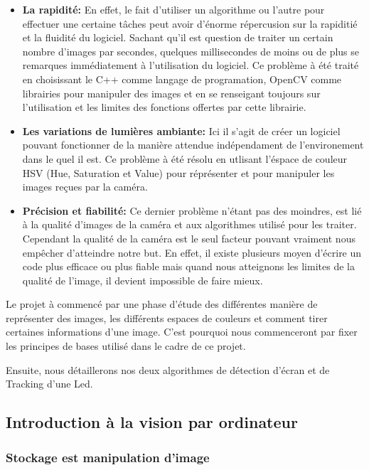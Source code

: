 \documentclass[11pt,a4paper,oldfontcommands]{memoir}
\begin{document}
\begin{itemize}
\item \textbf{La rapidité:} En effet, le fait d'utiliser un algorithme ou l'autre pour effectuer une certaine tâches peut avoir d'énorme répercusion sur la rapiditié et la fluidité du logiciel. Sachant qu'il est question de traiter un certain nombre d'images par secondes, quelques millisecondes de moins ou de plus se remarques immédiatement à l'utilisation du logiciel. Ce problème à été traité en choisissant le C++ comme langage de programation, OpenCV comme librairies pour manipuler des images et en se renseigant toujours sur l'utilisation et les limites des fonctions offertes par cette librairie.
\item \textbf{Les variations de lumières ambiante:} Ici il s'agit de créer un logiciel pouvant fonctionner de la manière attendue indépendament de l'environement dans le quel il est. Ce problème à été résolu en utlisant l'éspace de couleur HSV (Hue, Saturation et Value) pour réprésenter et pour manipuler les images reçues par la caméra.

\item \textbf{Précision et fiabilité:} Ce dernier problème n'étant pas des moindres, est lié à la qualité d'images de la caméra et aux algorithmes utilisé pour les traiter. Cependant la qualité de la caméra est le seul facteur pouvant vraiment nous empêcher d'atteindre notre but. En effet, il existe plusieurs moyen d'écrire un code plus efficace ou plus fiable mais quand nous atteignons les limites de la qualité de l'image, il devient impossible de faire mieux.

\end{itemize}

Le projet à commencé par une phase d'étude des différentes manière de représenter des images, les différents espaces de couleurs et comment tirer certaines informations d'une image. C'est pourquoi nous commenceront par fixer les principes de bases utilisé dans le cadre de ce projet.

Ensuite, nous détaillerons nos deux algorithmes de détection d'écran et de Tracking d'une Led.

\subsection{Introduction à la vision par ordinateur}



\subsubsection{Stockage est manipulation d'image}
\end{document}
